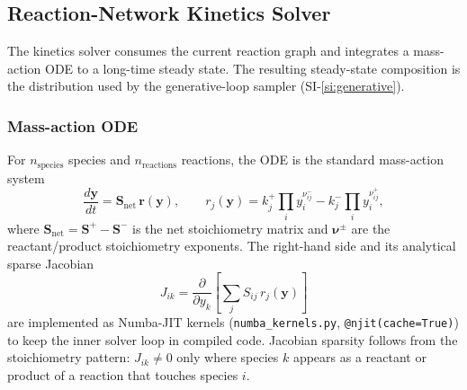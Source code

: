 %

\subsection{Reaction-Network Kinetics Solver}
\label{si:kinetics}

The kinetics solver consumes the current reaction graph and integrates a mass-action ODE to a long-time steady state. The resulting steady-state composition is the distribution used by the generative-loop sampler (SI-\ref{si:generative}).

\subsubsection{Mass-action ODE}
\label{sec:kinetics-ode}

For $n_\text{species}$ species and $n_\text{reactions}$ reactions, the ODE is the standard mass-action system
\begin{equation}
    \frac{d\mathbf{y}}{dt} = \mathbf{S}_\text{net}\,\mathbf{r}(\mathbf{y}), \qquad r_j(\mathbf{y}) = k_j^+ \prod_i y_i^{\nu_{ij}^-} - k_j^- \prod_i y_i^{\nu_{ij}^+},
\end{equation}
where $\mathbf{S}_\text{net} = \mathbf{S}^+ - \mathbf{S}^-$ is the net stoichiometry matrix and $\boldsymbol{\nu}^\pm$ are the reactant/product stoichiometry exponents. The right-hand side and its analytical sparse Jacobian
\begin{equation}
    J_{ik} = \frac{\partial}{\partial y_k}\!\left[\sum_j S_{ij}\, r_j(\mathbf{y})\right]
\end{equation}
are implemented as Numba-JIT kernels (\texttt{numba\_kernels.py}, \texttt{@njit(cache=True)}) to keep the inner solver loop in compiled code. Jacobian sparsity follows from the stoichiometry pattern: $J_{ik} \neq 0$ only where species $k$ appears as a reactant or product of a reaction that touches species $i$.

